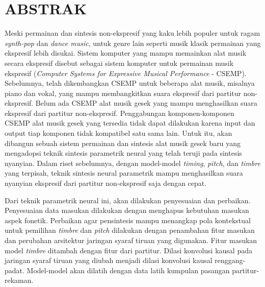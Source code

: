 \clearpage
\chapter*{ABSTRAK}

Meski permainan dan sintesis non-ekspresif yang kaku lebih populer untuk ragam \textit{synth-pop} dan \textit{dance music}, untuk genre lain seperti musik klasik permainan yang ekspresif lebih disukai. Sistem komputer yang mampu memainkan alat musik secara ekspresif disebut sebagai sistem komputer untuk permainan musik ekspresif (\textit{Computer Systems for Expressive Musical Performance} - CSEMP). Sebelumnya, telah dikembangkan CSEMP untuk beberapa alat musik, misalnya piano dan vokal, yang mampu membangkitkan suara ekspresif dari partitur non-ekspresif. Belum ada CSEMP alat musik gesek yang mampu menghasilkan suara ekspresif dari partitur non-ekspresif. Penggabungan komponen-komponen CSEMP alat musik gesek yang tersedia tidak dapat dilakukan karena input dan output tiap komponen tidak kompatibel satu sama lain. Untuk itu, akan dibangun sebuah sistem permainan dan sintesis alat musik gesek baru yang mengadopsi teknik sintesis parametrik neural yang telah teruji pada sintesis nyanyian. Dalam riset sebelumnya, dengan model-model \textit{timing}, \textit{pitch}, dan \textit{timbre} yang terpisah, teknik sintesis neural parametrik mampu menghasilkan suara nyanyian ekspresif dari partitur non-ekspresif saja dengan cepat.

Dari teknik parametrik neural ini, akan dilakukan penyesuaian dan perbaikan. Penyesuaian data masukan dilakukan dengan menghapus kebutuhan masukan aspek fonetik. Perbaikan agar pensintesis mampu menangkap pola kontekstual untuk pemilihan \textit{timbre} dan \textit{pitch} dilakukan dengan penambahan fitur masukan dan perubahan arsitektur jaringan syaraf tiruan yang digunakan. Fitur masukan model \textit{timbre} ditambah dengan fitur dari partitur. Dilasi konvolusi kausal pada jaringan syaraf tiruan yang diubah menjadi dilasi konvolusi kausal renggang-padat. Model-model akan dilatih dengan data latih kumpulan pasangan partitur-rekaman.

\clearpage